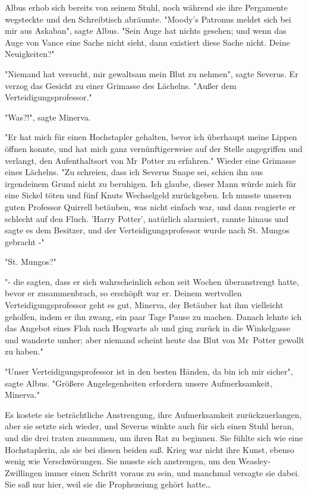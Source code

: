 {Albus erhob sich bereits von seinem Stuhl, noch während sie ihre Pergamente wegsteckte und den Schreibtisch abräumte. "Moody's Patronus meldet sich bei mir aus Askaban", sagte Albus. "Sein Auge hat nichts gesehen; und wenn das Auge von Vance eine Sache nicht sieht, dann existiert diese Sache nicht. Deine Neuigkeiten?"

"Niemand hat versucht, mir gewaltsam mein Blut zu nehmen", sagte Severus. Er verzog das Gesicht zu einer Grimasse des Lächelns. "Außer dem Verteidigungsprofessor."

"Was?!", sagte Minerva.

"Er hat mich für einen Hochstapler gehalten, bevor ich überhaupt meine Lippen öffnen konnte, und hat mich ganz vernünftigerweise auf der Stelle angegriffen und verlangt, den Aufenthaltsort von Mr~Potter zu erfahren." Wieder eine Grimasse eines Lächelns. "Zu schreien, dass ich Severus Snape sei, schien ihn aus irgendeinem Grund nicht zu beruhigen. Ich glaube, dieser Mann würde mich für eine Sickel töten und fünf Knuts Wechselgeld zurückgeben. Ich musste unseren guten Professor Quirrell betäuben, was nicht einfach war, und dann reagierte er schlecht auf den Fluch. 'Harry Potter', natürlich alarmiert, rannte hinaus und sagte es dem Besitzer, und der Verteidigungsprofessor wurde nach St. Mungos gebracht -"

"St. Mungos?"

"- die sagten, dass er sich wahrscheinlich schon seit Wochen überanstrengt hatte, bevor er zusammenbrach, so erschöpft war er. Deinem wertvollen Verteidigungsprofessor geht es gut, Minerva, der Betäuber hat ihm vielleicht geholfen, indem er ihn zwang, ein paar Tage Pause zu machen. Danach lehnte ich das Angebot eines Floh nach Hogwarts ab und ging zurück in die Winkelgasse und wanderte umher; aber niemand scheint heute das Blut von Mr~Potter gewollt zu haben."

"Unser Verteidigungsprofessor ist in den besten Händen, da bin ich mir sicher", sagte Albus. "Größere Angelegenheiten erfordern unsere Aufmerksamkeit, Minerva."

Es kostete sie beträchtliche Anstrengung, ihre Aufmerksamkeit zurückzuerlangen, aber sie setzte sich wieder, und Severus winkte auch für sich einen Stuhl heran, und die drei traten zusammen, um ihren Rat zu beginnen. Sie fühlte sich wie eine Hochstaplerin, als sie bei diesen beiden saß. Krieg war nicht ihre Kunst, ebenso wenig wie Verschwörungen. Sie musste sich anstrengen, um den Weasley-Zwillingen immer einen Schritt voraus zu sein, und manchmal versagte sie dabei. Sie saß nur hier, weil sie die Prophezeiung gehört hatte…

}
